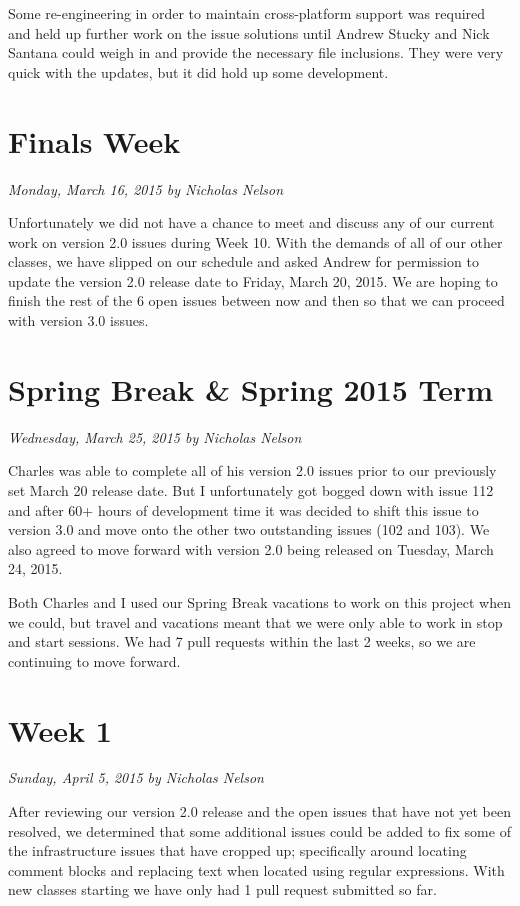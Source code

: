 \documentclass[11pt]{scrreprt}
\begin{document}
Some re-engineering in order to maintain cross-platform support was required and held up further work on the issue solutions until Andrew Stucky and Nick Santana could weigh in and provide the necessary file inclusions. They were very quick with the updates, but it did hold up some development.

\section{Finals Week}
\textit{Monday, March 16, 2015 by Nicholas Nelson}
\newline

Unfortunately we did not have a chance to meet and discuss any of our current work on version 2.0 issues during Week 10. With the demands of all of our other classes, we have slipped on our schedule and asked Andrew for permission to update the version 2.0 release date to Friday, March 20, 2015. We are hoping to finish the rest of the 6 open issues between now and then so that we can proceed with version 3.0 issues.

\section{Spring Break \& Spring 2015 Term}
\textit{Wednesday, March 25, 2015 by Nicholas Nelson}
\newline

Charles was able to complete all of his version 2.0 issues prior to our previously set March 20 release date. But I unfortunately got bogged down with issue 112 and after 60+ hours of development time it was decided to shift this issue to version 3.0 and move onto the other two outstanding issues (102 and 103). We also agreed to move forward with version 2.0 being released on Tuesday, March 24, 2015.

Both Charles and I used our Spring Break vacations to work on this project when we could, but travel and vacations meant that we were only able to work in stop and start sessions. We had 7 pull requests within the last 2 weeks, so we are continuing to move forward.

\section{Week 1}
\textit{Sunday, April 5, 2015 by Nicholas Nelson}
\newline

After reviewing our version 2.0 release and the open issues that have not yet been resolved, we determined that some additional issues could be added to fix some of the infrastructure issues that have cropped up; specifically around locating comment blocks and replacing text when located using regular expressions. With new classes starting we have only had 1 pull request submitted so far.
\end{document}
